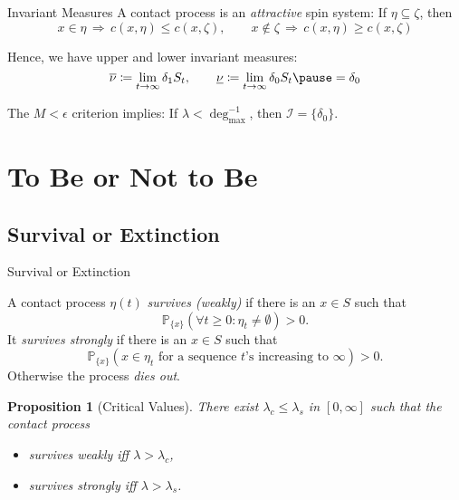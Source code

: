 \documentclass[envcountsect, aspectratio=149]{beamer}
\newtheorem{proposition}[theorem]{Proposition}
\renewcommand{\P}{\mathbb{P}}
\renewcommand{\[}{
	\setlength\abovedisplayskip{0.5ex}
	\setlength{\belowdisplayskip}{0.5ex}
	\setlength{\abovedisplayshortskip}{0.5ex}
	\setlength{\belowdisplayshortskip}{0.5ex}\begin{equation*}}
\begin{document}
	\begin{frame}{Invariant Measures}
		\pause
		A contact process is an \emph{attractive} spin system:
		If $\eta\subseteq \zeta$, then
			$$x \in \eta\, \Rightarrow\, c(x,\eta) \leq c(x,\zeta),\hspace{2em} x\notin\zeta \,\Rightarrow\, c(x,\eta) \geq c(x,\zeta) $$
			
		\bigskip\pause
		Hence, we have upper and lower invariant measures:
		$$\overline{\nu} \coloneqq \lim_{t\to\infty} \delta_1 S_t, \hspace{2em} \underline{\nu} \coloneqq \lim_{t\to\infty} \delta_0 S_t\pause = \delta_0 $$ 
		
		\bigskip\pause
		The $M<\epsilon$ criterion implies: If $\lambda < \deg_{\max}^{-1}$, then $\mathcal{I} = \{ \delta_0 \}$.
	\end{frame}
	
	\section{To Be or Not to Be}
	\subsection{Survival or Extinction}
	
	\begin{frame}{Survival or Extinction}
		\begin{definition}[Survival]
			A contact process $\eta(t)$ \emph{survives (weakly)} if there is an $x\in S$ such that $$\P_{\{x\}} (\forall t \geq0 : \eta_t \neq \emptyset) > 0.$$
			\pause
			It \emph{survives strongly} if there is an $x\in S$ such that
			$$\P_{\{x\}}(x\in\eta_t \text{ for a sequence $t$'s increasing to $\infty$})> 0.$$\pause
			Otherwise the process \emph{dies out}.
		\end{definition}
		\pause
		\begin{proposition}[Critical Values]
			There exist $\lambda_c \leq \lambda_s$ in $[0,\infty]$ such that the contact process
			\begin{itemize}[label=$\bullet$]
				\item survives weakly iff $\lambda > \lambda_c$,
				\item survives strongly iff $\lambda > \lambda_s$.
			\end{itemize}
		\end{proposition}
	\end{frame}
	
\end{document}
